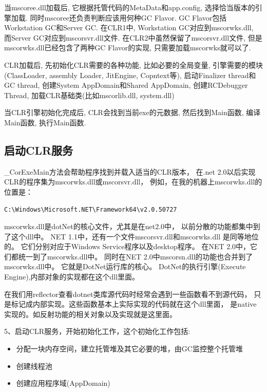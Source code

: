 \documentclass{book}
\begin{document}
当mscoree.dll加载后, 它根据托管代码的MetaData和app.config,
选择恰当版本的引擎加载. 同时mscoree还负责判断应该用何种GC Flavor. 
GC Flavor包括Workstation GC和Server GC. 
在CLR1中, Workstation GC对应到mscorwks.dll, 
而Server GC对应到mscorsvr.dll文件. 在CLR2中虽然保留了mscorsvr.dll文件, 
但是mscorwks.dll已经包含了两种GC Flavor的实现, 只需要加载mscorwks就可以了.
 
CLR加载后, 先初始化CLR需要的各种功能, 比如必要的全局变量, 
引擎需要的模块(ClassLoader, assembly Loader, JitEngine, Copntext等), 
启动Finalizer thread和GC thread, 创建System AppDomain和Shared AppDomain, 
创建RCDebugger Thread, 加载CLR基础类(比如mscorlib.dll, system.dll)
 
当CLR引擎初始化完成后, CLR会找到当前exe的元数据, 然后找到Main函数, 编译Main函数, 
执行Main函数.



\subsection{启动CLR服务}

\_CorExeMain方法会帮助程序找到并载入适当的CLR版本，
在.net 2.0以后实现CLR的程序集为mscorwks.dll或mscorsvr.dll，
例如，在我的机器上mscorwks.dll的位置是：

\begin{lstlisting}[language=Bash]
C:\Windows\Microsoft.NET\Framework64\v2.0.50727
\end{lstlisting}

mscorwks.dll是dotNet的核心文件，尤其是在net2.0中，
以前分散的功能都集中到了这个dll中。 
NET 1.1中，还有一个文件mscorsvr.dll和mscorwks.dll 是同等地位的。 
它们分别对应于Windows Service程序以及desktop程序。 
在NET 2.0中，它们都统一到了mscorwks.dll中。 
同时在NET 2.0中mscorsn.dll的功能也合并到了mscorwks.dll中。 
它就是DotNet运行库的核心。 
DotNet的执行引擎(Execute Engine),内部对象的实现都在这个dll里面。 
   
在我们用reflector查看dotnet类库源代码时经常会遇到一些函数看不到源代码，
只是标记成内部实现。这些函数基本上实际实现的代码就在这个dll里面，
是native实现的。如反射功能的相关对象以及实现就是这里面。 

5、启动CLR服务，开始初始化工作，这个初始化工作包括:

\begin{itemize}
\item{分配一块内存空间，建立托管堆及其它必要的堆，由GC监控整个托管堆}
\item{创建线程池}
\item{创建应用程序域(AppDomain)}
\end{itemize}
\end{document}
